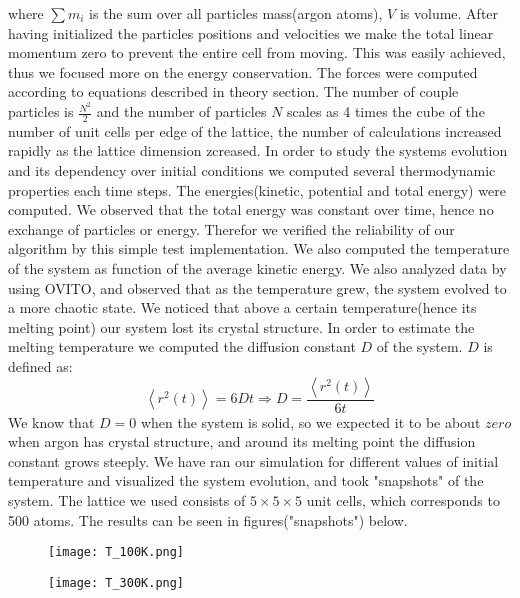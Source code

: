 \documentclass[a4paper]{article}
\begin{document}
where $\sum m_i$ is the sum over all particles mass(argon atoms), $V$ is volume. After having initialized the particles positions and velocities we make the total linear momentum zero to prevent the entire cell from moving. This was easily achieved, thus we focused more on the energy conservation. The forces were computed according to equations described in theory section. The number of couple particles is $\frac{N^2}{2}$ and the number of particles $N$ scales as 4 times the cube of the number of unit cells per edge of the lattice, the number of calculations increased rapidly as the lattice dimension zcreased. In order to study the systems evolution and its dependency over initial conditions we computed several thermodynamic properties each time steps. The energies(kinetic, potential and total energy) were computed. We observed that the total energy was constant over time, hence no exchange of particles or energy. Therefor we verified the reliability of our algorithm by this simple test implementation. We also computed the temperature of the system as function of the average kinetic energy. We also analyzed data by using OVITO, and observed that as the temperature grew, the system evolved to a more chaotic state. We noticed that above a certain temperature(hence its melting point) our system lost its crystal structure. In order to estimate the melting temperature we computed the diffusion constant $D$ of the system. $D$ is defined as: 
\begin{equation}
\left< r^2(t) \right > = 6Dt \Rightarrow D = \frac{\left< r^2(t) \right >}{6t}
\end{equation}
We know that $D=0$ when the system is solid, so we expected it to be about $zero$ when argon has crystal structure, and around its melting point the diffusion constant grows steeply.
We have ran our simulation for different values of initial temperature and visualized the system evolution, and took "snapshots" of the system. The lattice we used consists of $5\times 5 \times 5$ unit cells, which corresponds to 500 atoms. The results can be seen in figures("snapshots") below. 

\begin{figure}[!htbp] 
\centering
\begin{minipage}{.55\textwidth}
	\centering
	\texttt{[image: T\_100K.png]}
    \captionsetup{width=0.7\linewidth}
    \label{fig:T_100}
\end{minipage}%
\begin{minipage}{.55\textwidth}
	\centering
	\texttt{[image: T\_300K.png]}
    \captionsetup{width=0.7\linewidth}
    \label{fig:T_300}
\end{minipage}
\end{figure}
\end{document}
